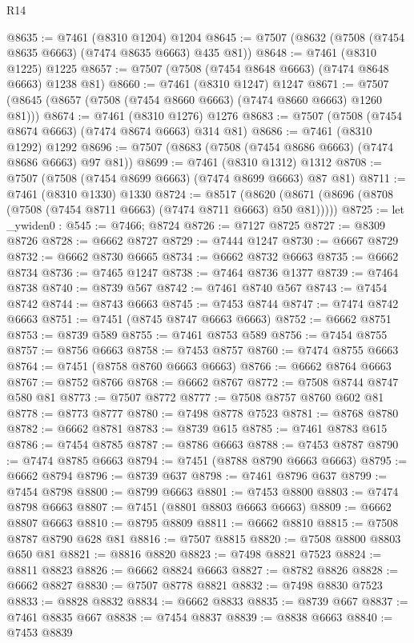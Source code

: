\begin{lexlean}{R14}
\begin{coremodule}
{{{{{{{{{{{{{{{{{{{{{{{{{{{{{{{{{{{{{{{{{{{{{{{{{{{{{{{{{{{{{{{{{{{{{{{{{{{{{{{{{{@8635 := @7461 (@8310 @1204) @1204
@8645 := @7507 (@8632 (@7508 (@7454 @8635 @6663) (@7474 @8635 @6663) @435 @81))
@8648 := @7461 (@8310 @1225) @1225
@8657 := @7507 (@7508 (@7454 @8648 @6663) (@7474 @8648 @6663) @1238 @81)
@8660 := @7461 (@8310 @1247) @1247
@8671 := @7507 (@8645 (@8657 (@7508 (@7454 @8660 @6663) (@7474 @8660 @6663) @1260 @81)))
@8674 := @7461 (@8310 @1276) @1276
@8683 := @7507 (@7508 (@7454 @8674 @6663) (@7474 @8674 @6663) @314 @81)
@8686 := @7461 (@8310 @1292) @1292
@8696 := @7507 (@8683 (@7508 (@7454 @8686 @6663) (@7474 @8686 @6663) @97 @81))
@8699 := @7461 (@8310 @1312) @1312
@8708 := @7507 (@7508 (@7454 @8699 @6663) (@7474 @8699 @6663) @87 @81)
@8711 := @7461 (@8310 @1330) @1330
@8724 := @8517
    (@8620 (@8671 (@8696 (@8708 (@7508 (@7454 @8711 @6663) (@7474 @8711 @6663) @50 @81)))))
@8725 := let _ywiden0 : @545 := @7466; @8724
@8726 := @7127 @8725
@8727 := @8309 @8726
@8728 := @6662 @8727
@8729 := @7444 @1247
@8730 := @6667 @8729
@8732 := @6662 @8730 @6665
@8734 := @6662 @8732 @6663
@8735 := @6662 @8734
@8736 := @7465 @1247
@8738 := @7464 @8736 @1377
@8739 := @7464 @8738
@8740 := @8739 @567
@8742 := @7461 @8740 @567
@8743 := @7454 @8742
@8744 := @8743 @6663
@8745 := @7453 @8744
@8747 := @7474 @8742 @6663
@8751 := @7451 (@8745 @8747 @6663 @6663)
@8752 := @6662 @8751
@8753 := @8739 @589
@8755 := @7461 @8753 @589
@8756 := @7454 @8755
@8757 := @8756 @6663
@8758 := @7453 @8757
@8760 := @7474 @8755 @6663
@8764 := @7451 (@8758 @8760 @6663 @6663)
@8766 := @6662 @8764 @6663
@8767 := @8752 @8766
@8768 := @6662 @8767
@8772 := @7508 @8744 @8747 @580 @81
@8773 := @7507 @8772
@8777 := @7508 @8757 @8760 @602 @81
@8778 := @8773 @8777
@8780 := @7498 @8778 @7523
@8781 := @8768 @8780
@8782 := @6662 @8781
@8783 := @8739 @615
@8785 := @7461 @8783 @615
@8786 := @7454 @8785
@8787 := @8786 @6663
@8788 := @7453 @8787
@8790 := @7474 @8785 @6663
@8794 := @7451 (@8788 @8790 @6663 @6663)
@8795 := @6662 @8794
@8796 := @8739 @637
@8798 := @7461 @8796 @637
@8799 := @7454 @8798
@8800 := @8799 @6663
@8801 := @7453 @8800
@8803 := @7474 @8798 @6663
@8807 := @7451 (@8801 @8803 @6663 @6663)
@8809 := @6662 @8807 @6663
@8810 := @8795 @8809
@8811 := @6662 @8810
@8815 := @7508 @8787 @8790 @628 @81
@8816 := @7507 @8815
@8820 := @7508 @8800 @8803 @650 @81
@8821 := @8816 @8820
@8823 := @7498 @8821 @7523
@8824 := @8811 @8823
@8826 := @6662 @8824 @6663
@8827 := @8782 @8826
@8828 := @6662 @8827
@8830 := @7507 @8778 @8821
@8832 := @7498 @8830 @7523
@8833 := @8828 @8832
@8834 := @6662 @8833
@8835 := @8739 @667
@8837 := @7461 @8835 @667
@8838 := @7454 @8837
@8839 := @8838 @6663
@8840 := @7453 @8839
}}}}}}}}}}}}}}}}}}}}}}}}}}}}}}}}}}}}}}}}}}}}}}}}}}}}}}}}}}}}}}}}}}}}}}}}}}}}}}}}}}
\end{coremodule}
\end{lexlean}
